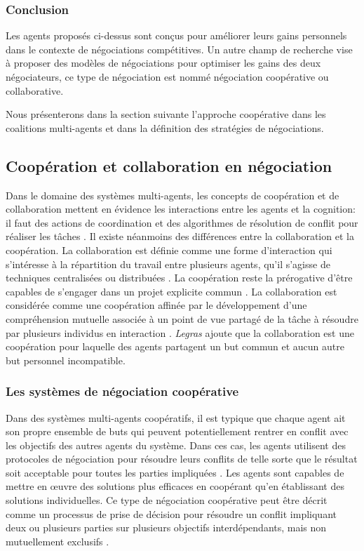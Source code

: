 	\subsubsection{Conclusion}		
	Les agents proposés ci-dessus sont conçus pour améliorer leurs gains personnels dans le contexte de négociations compétitives. Un autre champ de recherche vise à proposer des modèles de négociations pour optimiser les gains des deux négociateurs, ce type de négociation est nommé négociation coopérative ou collaborative. 
	
	Nous présenterons dans la section suivante l'approche coopérative dans les coalitions multi-agents et dans la définition des stratégies de négociations. 
	
		\subsection{Coopération et collaboration en négociation}
		
		Dans le domaine des systèmes multi-agents, les concepts de coopération et de collaboration mettent en évidence les interactions entre les agents et la cognition: il faut des actions de coordination et des algorithmes de résolution de conflit pour réaliser les tâches \cite{jennings1995controlling}. Il existe néanmoins des différences entre la collaboration et la coopération.
		La collaboration est définie comme une forme d'interaction qui s'intéresse à la répartition du travail entre plusieurs agents, qu'il s'agisse de techniques centralisées ou distribuées \cite{ferber1997systemes}. La coopération reste la prérogative d'être capables de s'engager dans un projet explicite commun \cite{lucien2016multiagent}.
		La collaboration est considérée comme une coopération affinée par le développement d'une compréhension mutuelle associée à un point de vue partagé de la tâche à résoudre par plusieurs individus en interaction \cite{weiss1999multiagent,blanquet2007web}. \emph{Legras} \cite{legrascooperation} ajoute que la collaboration est une coopération pour laquelle des agents partagent un but commun et aucun autre but personnel incompatible. 
		
		\subsubsection{Les systèmes de négociation coopérative}
		
		Dans des systèmes multi-agents coopératifs, il est typique que chaque agent ait son propre ensemble de buts qui peuvent potentiellement rentrer en conflit avec les objectifs des autres agents du système.
		 Dans ces cas, les agents utilisent des protocoles de négociation pour résoudre leurs conflits de telle sorte que le résultat soit acceptable pour toutes les parties impliquées \cite{wollkind2004automated}. Les agents sont capables de mettre en œuvre des solutions plus efficaces en coopérant qu'en établissant des solutions individuelles. Ce type de négociation coopérative peut être décrit comme un processus de prise de décision pour résoudre un conflit impliquant deux ou plusieurs parties sur plusieurs objectifs interdépendants, mais non mutuellement exclusifs \cite{lewicki2011essentials}. 
	
